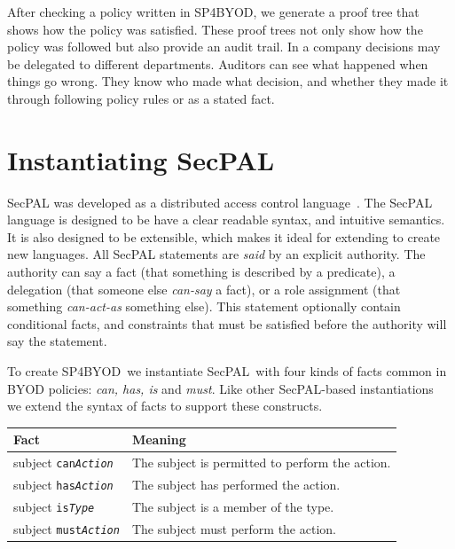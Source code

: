 \documentclass{llncs}
\newcommand{\AppPAL}[0]{SP4BYOD}
\begin{document}
After checking a policy written in \AppPAL, we generate a proof tree that shows how the policy was satisfied.
These proof trees not only show how the policy was followed but also provide an audit trail.
In a company decisions may be delegated to different departments.
Auditors can see what happened when things go wrong.
They know who made what decision, and whether they made it through following policy rules or as a stated fact.


\section{Instantiating SecPAL}
\label{ssec:changes}

SecPAL was developed as a distributed access control language~\cite{becker_secpal:_2010}.
The SecPAL language is designed to be have a clear readable syntax, and intuitive semantics.
It is also designed to be extensible, which makes it ideal for extending to create new languages.
All SecPAL statements are \emph{said} by an explicit authority.
The authority can say a fact (that something is described by a predicate), a delegation (that someone else \emph{can-say} a fact), or a role assignment (that something \emph{can-act-as} something else).
This statement optionally contain conditional facts, and constraints that must be satisfied before the authority will say the statement.

To create \AppPAL~we instantiate SecPAL~with four kinds of facts common in BYOD policies: \emph{can, has, is} and \emph{must}.
Like other SecPAL-based instantiations~\cite{becker_framework_2009,aziz_secpal4dsa:_2011} we extend the syntax of facts to support these constructs.

\begin{center}
  \footnotesize\sffamily
  \newcommand{\predicate}[3]{#1 \texttt{#2\textit{#3}}}
  \begin{tabular}{l l}
    \toprule
    Fact                              & Meaning                                         \\
    \midrule
    \predicate{subject}{can}{Action}  & The subject is permitted to perform the action. \\
    \predicate{subject}{has}{Action}  & The subject has performed the action.           \\
    \predicate{subject}{is}{Type}     & The subject is a member of the type.            \\
    \predicate{subject}{must}{Action} & The subject must perform the action.            \\
    \bottomrule
  \end{tabular}
\end{center}
\end{document}
